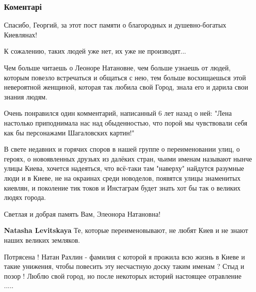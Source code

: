  
 
 
 
 
\subsubsection{Коментарі}
\label{sec:11_11_2021.fb.fb_group.story_kiev_ua.2.pamjat_rahlina_eleonora.cmt}

\begin{itemize} %

Спасибо, Георгий, за этот пост памяти о благородных и душевно-богатых
Киевлянах!

К сожалению, таких людей уже нет, их уже не производят...

Чем больше читаешь о Леоноре Натановне, чем больше узнаешь от людей, которым
повезло встречаться и общаться с нею, тем больше восхищаешься этой невероятной
женщиной, которая так любила свой Город, знала его и дарила свои знания людям.

Очень понравился один комментарий, написанный 6 лет назад о ней: "Лена
настолько приподнимала нас над обыденностью, что порой мы чувствовали себя как
бы персонажами Шагаловских картин!"

В свете недавних и горячих споров в нашей группе о переименовании улиц, о
героях, о новоявленных друзьях из далёких стран, чьими именам называют нынче
улицы Киева, хочется надеяться, что всё-таки там "наверху" найдутся разумные
люди и в Киеве, не на окраинах среди новоделов, появятся улицы знаменитых
киевлян, и поколение тик токов и Инстаграм будет знать хот бы так о великих
людях города.

Светлая и добрая память Вам, Элеонора Натановна!

\begin{itemize} %
\textbf{Natasha Levitskaya} Те, которые переименовывают, не любят Киев и не знают наших великих земляков.
\end{itemize} %


Потрясена ! Натан Рахлин - фамилия с которой я прожила всю жизнь в Киеве и
такие унижения, чтобы повесить эту несчастную доску таким именам ? Стыд и позор
! Люблю свой город, но после некоторых историй настоящее отравление .....



\end{itemize}
